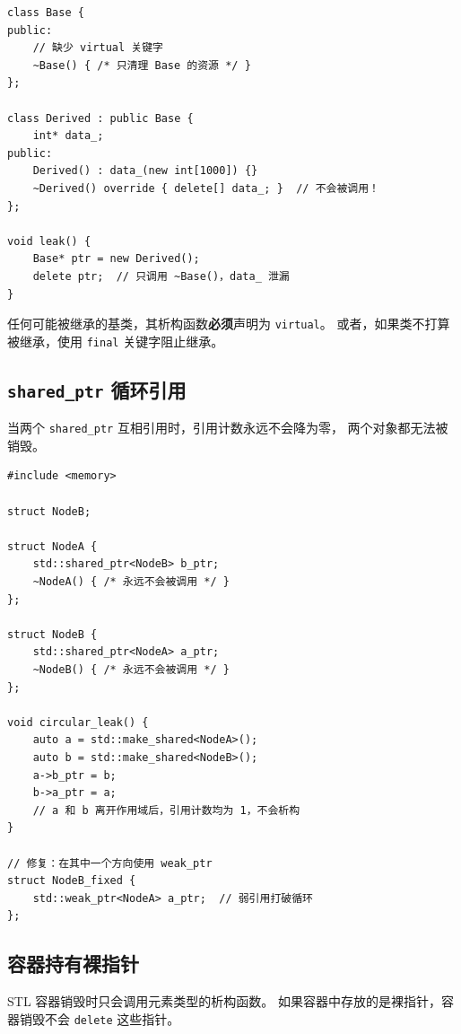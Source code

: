 \documentclass[12pt,a4paper,fontset=fandol]{ctexbook}
\begin{document}
\begin{lstlisting}[style=cppstyle, caption={缺少虚析构函数}]
class Base {
public:
    // 缺少 virtual 关键字
    ~Base() { /* 只清理 Base 的资源 */ }
};

class Derived : public Base {
    int* data_;
public:
    Derived() : data_(new int[1000]) {}
    ~Derived() override { delete[] data_; }  // 不会被调用！
};

void leak() {
    Base* ptr = new Derived();
    delete ptr;  // 只调用 ~Base()，data_ 泄漏
}
\end{lstlisting}

\begin{warning}[title={关键规则}]
任何可能被继承的基类，其析构函数\textbf{必须}声明为 \texttt{virtual}。
或者，如果类不打算被继承，使用 \texttt{final} 关键字阻止继承。
\end{warning}

\subsection{\texttt{shared\_ptr} 循环引用}

当两个 \texttt{shared\_ptr} 互相引用时，引用计数永远不会降为零，
两个对象都无法被销毁。

\begin{lstlisting}[style=cppstyle, caption={shared\_ptr 循环引用}]
#include <memory>

struct NodeB;

struct NodeA {
    std::shared_ptr<NodeB> b_ptr;
    ~NodeA() { /* 永远不会被调用 */ }
};

struct NodeB {
    std::shared_ptr<NodeA> a_ptr;
    ~NodeB() { /* 永远不会被调用 */ }
};

void circular_leak() {
    auto a = std::make_shared<NodeA>();
    auto b = std::make_shared<NodeB>();
    a->b_ptr = b;
    b->a_ptr = a;
    // a 和 b 离开作用域后，引用计数均为 1，不会析构
}

// 修复：在其中一个方向使用 weak_ptr
struct NodeB_fixed {
    std::weak_ptr<NodeA> a_ptr;  // 弱引用打破循环
};
\end{lstlisting}

\subsection{容器持有裸指针}

STL 容器销毁时只会调用元素类型的析构函数。
如果容器中存放的是裸指针，容器销毁不会 \texttt{delete} 这些指针。
\end{document}
